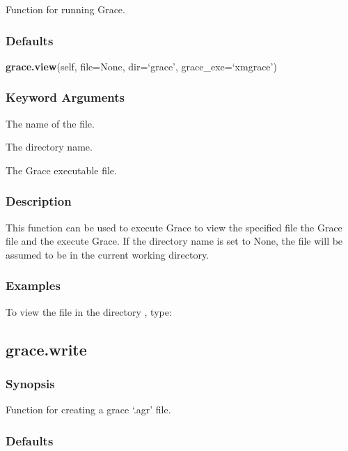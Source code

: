 Function for running Grace.

\subsubsection{Defaults}

\textsf{\textbf{grace.view}(self, file=None, dir=`grace', grace\_exe=`xmgrace')}


\subsubsection{Keyword Arguments}


  The name of the file.

  The directory name.

  The Grace executable file.

\subsubsection{Description}

This function can be used to execute Grace to view the specified file the Grace 
 file
and the execute Grace. If the directory name is set to None, the file will be assumed to be
in the current working directory.


\subsubsection{Examples}

To view the file 
 in the directory 
, type:





\newpage

\subsection{grace.write}


\subsubsection{Synopsis}

Function for creating a grace `.agr' file.

\subsubsection{Defaults}

